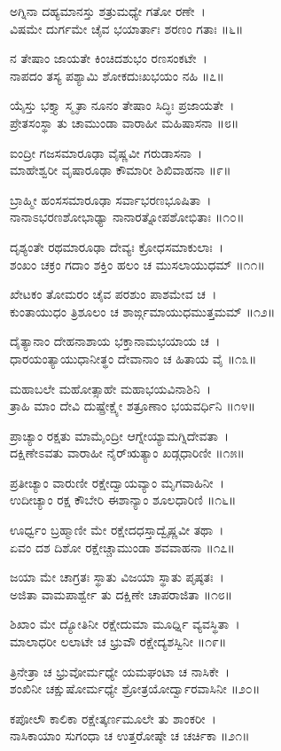 ಅಗ್ನಿನಾ ದಹ್ಯಮಾನಸ್ತು ಶತ್ರುಮಧ್ಯೇ ಗತೋ ರಣೇ~।\\
ವಿಷಮೇ ದುರ್ಗಮೇ ಚೈವ ಭಯಾರ್ತಾಃ ಶರಣಂ ಗತಾಃ ॥೬॥

ನ ತೇಷಾಂ ಜಾಯತೇ ಕಿಂಚಿದಶುಭಂ ರಣಸಂಕಟೇ~।\\
ನಾಪದಂ ತಸ್ಯ ಪಶ್ಯಾಮಿ ಶೋಕದುಃಖಭಯಂ ನಹಿ ॥೭॥

ಯೈಸ್ತು ಭಕ್ತ್ಯಾ ಸ್ಮೃತಾ ನೂನಂ ತೇಷಾಂ ಸಿದ್ಧಿಃ ಪ್ರಜಾಯತೇ~।\\
ಪ್ರೇತಸಂಸ್ಥಾ ತು ಚಾಮುಂಡಾ ವಾರಾಹೀ ಮಹಿಷಾಸನಾ ॥೮॥

ಐಂದ್ರೀ ಗಜಸಮಾರೂಢಾ ವೈಷ್ಣವೀ ಗರುಡಾಸನಾ~।\\
ಮಾಹೇಶ್ವರೀ ವೃಷಾರೂಢಾ ಕೌಮಾರೀ ಶಿಖಿವಾಹನಾ ॥೯॥

ಬ್ರಾಹ್ಮೀ ಹಂಸಸಮಾರೂಢಾ ಸರ್ವಾಭರಣಭೂಷಿತಾ~।\\
ನಾನಾಽಭರಣಶೋಭಾಢ್ಯಾ ನಾನಾರತ್ನೋಪಶೋಭಿತಾಃ ॥೧೦॥

ದೃಶ್ಯಂತೇ ರಥಮಾರೂಢಾ ದೇವ್ಯಃ ಕ್ರೋಧಸಮಾಕುಲಾಃ~।\\
ಶಂಖಂ ಚಕ್ರಂ ಗದಾಂ ಶಕ್ತಿಂ ಹಲಂ ಚ ಮುಸಲಾಯುಧಮ್ ॥೧೧॥

ಖೇಟಕಂ ತೋಮರಂ ಚೈವ ಪರಶುಂ ಪಾಶಮೇವ ಚ~।\\
ಕುಂತಾಯುಧಂ ತ್ರಿಶೂಲಂ ಚ ಶಾರ್ಙ್ಗಮಾಯುಧಮುತ್ತಮಮ್ ॥೧೨॥

ದೈತ್ಯಾನಾಂ ದೇಹನಾಶಾಯ ಭಕ್ತಾನಾಮಭಯಾಯ ಚ~।\\
ಧಾರಯಂತ್ಯಾಯುಧಾನೀತ್ಥಂ ದೇವಾನಾಂ ಚ ಹಿತಾಯ ವೈ ॥೧೩॥

ಮಹಾಬಲೇ ಮಹೋತ್ಸಾಹೇ ಮಹಾಭಯವಿನಾಶಿನಿ~।\\
ತ್ರಾಹಿ ಮಾಂ ದೇವಿ ದುಷ್ಪ್ರೇಕ್ಷ್ಯೇ ಶತ್ರೂಣಾಂ ಭಯವರ್ಧಿನಿ ॥೧೪॥

ಪ್ರಾಚ್ಯಾಂ ರಕ್ಷತು ಮಾಮೈಂದ್ರೀ ಆಗ್ನೇಯ್ಯಾಮಗ್ನಿದೇವತಾ~।\\
ದಕ್ಷಿಣೇಽವತು ವಾರಾಹೀ ನೈರ್‌ಋತ್ಯಾಂ ಖಡ್ಗಧಾರಿಣೀ ॥೧೫॥

ಪ್ರತೀಚ್ಯಾಂ ವಾರುಣೀ ರಕ್ಷೇದ್ವಾಯವ್ಯಾಂ ಮೃಗವಾಹಿನೀ~।\\
ಉದೀಚ್ಯಾಂ ರಕ್ಷ ಕೌಬೇರಿ ಈಶಾನ್ಯಾಂ ಶೂಲಧಾರಿಣಿ ॥೧೬॥

ಊರ್ಧ್ವಂ ಬ್ರಹ್ಮಾಣೀ ಮೇ ರಕ್ಷೇದಧಸ್ತಾದ್ವೈಷ್ಣವೀ ತಥಾ~।\\
ಏವಂ ದಶ ದಿಶೋ ರಕ್ಷೇಚ್ಚಾಮುಂಡಾ ಶವವಾಹನಾ ॥೧೭॥

ಜಯಾ ಮೇ ಚಾಗ್ರತಃ ಸ್ಥಾತು ವಿಜಯಾ ಸ್ಥಾತು ಪೃಷ್ಠತಃ~।\\
ಅಜಿತಾ ವಾಮಪಾರ್ಶ್ವೇ ತು ದಕ್ಷಿಣೇ ಚಾಪರಾಜಿತಾ ॥೧೮॥

ಶಿಖಾಂ ಮೇ ದ್ಯೋತಿನೀ ರಕ್ಷೇದುಮಾ ಮೂರ್ಧ್ನಿ ವ್ಯವಸ್ಥಿತಾ~।\\
ಮಾಲಾಧರೀ ಲಲಾಟೇ ಚ ಭ್ರುವೌ ರಕ್ಷೇದ್ಯಶಸ್ವಿನೀ ॥೧೯॥

ತ್ರಿನೇತ್ರಾ ಚ ಭ್ರುವೋರ್ಮಧ್ಯೇ ಯಮಘಂಟಾ ಚ ನಾಸಿಕೇ~।\\
ಶಂಖಿನೀ ಚಕ್ಷುಷೋರ್ಮಧ್ಯೇ ಶ್ರೋತ್ರಯೋರ್ದ್ವಾರವಾಸಿನೀ ॥೨೦॥

ಕಪೋಲೌ ಕಾಲಿಕಾ ರಕ್ಷೇತ್ಕರ್ಣಮೂಲೇ ತು ಶಾಂಕರೀ~।\\
ನಾಸಿಕಾಯಾಂ ಸುಗಂಧಾ ಚ ಉತ್ತರೋಷ್ಠೇ ಚ ಚರ್ಚಿಕಾ ॥೨೧॥

